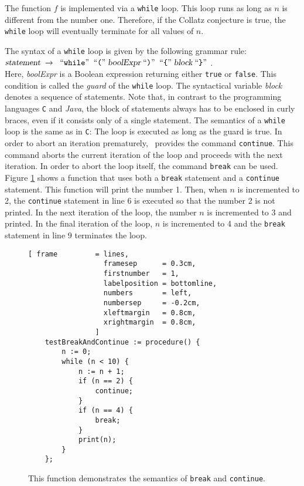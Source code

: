 The function $f$ is implemented via a \texttt{while} loop.  This loop runs as long as $n$
is different from the number one.  Therefore, if the Collatz conjecture is true, the \texttt{while}
loop will eventually terminate for all values of $n$.

The syntax of a \texttt{while} loop is given by the following
grammar rule:
\\[0.2cm]
\hspace*{1.3cm}
$\textsl{statement} \;\rightarrow\; \;\mbox{``\texttt{while}''}\; \;\mbox{``\texttt{(}''}\; \textsl{boolExpr} \;\mbox{``\texttt{)}''}\;
 \;\mbox{``\texttt{\{}''}\;  \textsl{block} \;\mbox{``\texttt{\}}''}\; 
$.
\\[0.2cm]
Here, \textsl{boolExpr} is a Boolean expression returning either \texttt{true} or
\texttt{false}.  This condition is called the \emph{guard} of the \texttt{while} loop.
The syntactical variable \textsl{block} denotes a sequence of statements.  Note that, 
in contrast to the programming languages \texttt{C} and \textsl{Java}, the
block of statements always has to be enclosed in curly braces, even if it consists only of a
single statement.  The semantics of a \texttt{while} loop is the same as in \texttt{C}:
The loop is executed as long as the guard is true.  In order to abort an iteration
prematurely, \setlx\ provides the command \texttt{continue}.  This command aborts the
current iteration of the loop and proceeds with the next iteration.  In order to abort the
loop itself, the command \texttt{break} can be used.  Figure \ref{fig:break-and-continue.stlx} shows
a function that uses both a \texttt{break} statement and a \texttt{continue} statement.  This
function will print the number 1.  Then, when $n$ is incremented to 2, the \texttt{continue}
statement in line 6 is executed so that the number 2 is not printed.  In the next iteration of the
loop, the number $n$ is incremented to 3 and printed.  In the final iteration of the loop, $n$ is
incremented to 4 and the \texttt{break} statement in line 9 terminates the loop.


\begin{figure}[!ht]
\centering
\begin{Verbatim}[ frame         = lines, 
                  framesep      = 0.3cm, 
                  firstnumber   = 1,
                  labelposition = bottomline,
                  numbers       = left,
                  numbersep     = -0.2cm,
                  xleftmargin   = 0.8cm,
                  xrightmargin  = 0.8cm,
                ]
    testBreakAndContinue := procedure() {
        n := 0;
        while (n < 10) {
            n := n + 1;
            if (n == 2) {
                continue;
            }
            if (n == 4) {
                break;
            }
            print(n);
        }
    };
\end{Verbatim}
\vspace*{-0.3cm}
\caption{This function demonstrates the semantics of \texttt{break} and \texttt{continue}.}
\label{fig:break-and-continue.stlx}
\end{figure}


